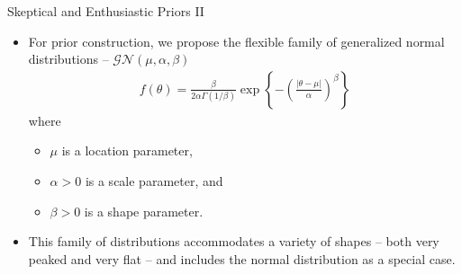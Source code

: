 \documentclass{beamer}
\begin{document}
\begin{frame}{Skeptical and Enthusiastic Priors II}
\begin{itemize}
\item For prior construction, we propose the flexible family of generalized normal distributions -- $\mathcal{GN}(\mu,\alpha,\beta)$
\begin{align*}
f(\theta)=\frac{\beta}{2\alpha\Gamma(1/\beta)}\exp\left\{-\left(\frac{|\theta-\mu|}{\alpha}\right)^\beta\right\}
\end{align*} where 
		\begin{itemize}
					  \vspace{0.2cm}
						\item $\mu$ is a location parameter, 
						
						\vspace{0.2cm}
						\item $\alpha>0$ is a scale parameter, and 
													
						\vspace{0.2cm}							
						\item $\beta>0$ is a shape parameter.		
		\end{itemize} 
	
	\vspace{0.3cm}	
	\item This family of distributions accommodates a variety of shapes -- both very peaked and very flat -- and includes the normal distribution as a special case.
\end{itemize}
\end{frame}
\end{document}
